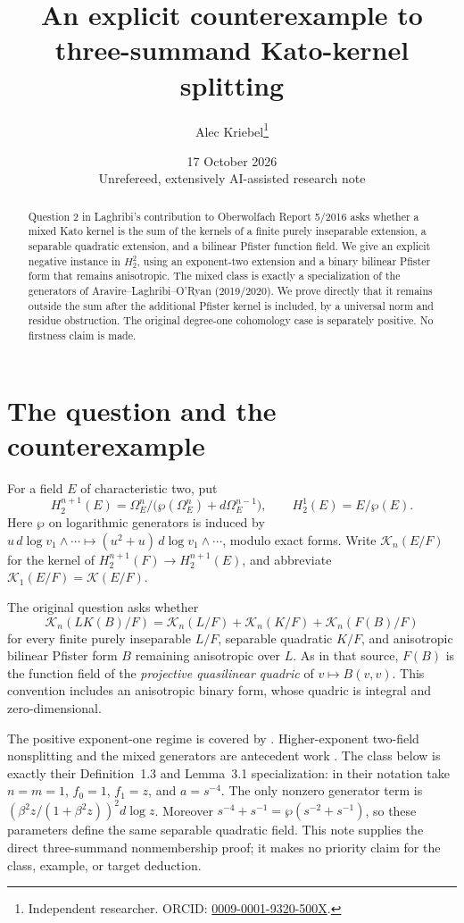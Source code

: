 \documentclass[11pt]{article}
\title{An explicit counterexample to three-summand Kato-kernel splitting}
\author{Alec Kriebel\thanks{Independent researcher. ORCID:
\href{https://orcid.org/0009-0001-9320-500X}{0009-0001-9320-500X}.}}
\date{17 October 2026\\[2pt]\small Unrefereed, extensively AI-assisted research note}
\newcommand{\K}{\mathcal K}
\begin{document}
\maketitle
\begin{abstract}
Question 2 in Laghribi's contribution to Oberwolfach Report 5/2016 asks
whether a mixed Kato kernel is the sum of the kernels of a finite purely
inseparable extension, a separable quadratic extension, and a bilinear
Pfister function field. We give an explicit negative instance in
\(H_2^2\), using an exponent-two extension and a binary bilinear Pfister
form that remains anisotropic. The mixed class is exactly a specialization
of the generators of Aravire--Laghribi--O'Ryan (2019/2020). We prove directly
that it remains outside the sum after the additional Pfister kernel is
included, by a universal norm and residue obstruction. The original
degree-one cohomology case is separately positive. No firstness claim is made.
\end{abstract}

\section{The question and the counterexample}
For a field \(E\) of characteristic two, put
\[
 H_2^{n+1}(E)=
 \Omega_E^n/\bigl(\wp(\Omega_E^n)+d\Omega_E^{n-1}\bigr),\qquad
 H_2^1(E)=E/\wp(E).
\]
Here \(\wp\) on logarithmic generators is induced by
\(u\,d\log v_1\wedge\cdots\mapsto
(u^2+u)\,d\log v_1\wedge\cdots\), modulo exact forms.
Write \(\K_n(E/F)\) for the kernel of
\(H_2^{n+1}(F)\to H_2^{n+1}(E)\), and abbreviate
\(\K_1(E/F)=\K(E/F)\).

The original question \cite[printed p.~251, Question~2]{OWR} asks whether
\begin{equation}\label{question}
 \K_n(LK(B)/F)=\K_n(L/F)+\K_n(K/F)+\K_n(F(B)/F)
\end{equation}
for every finite purely inseparable \(L/F\), separable quadratic \(K/F\),
and anisotropic bilinear Pfister form \(B\) remaining anisotropic over \(L\).
As in that source, \(F(B)\) is the function field of the
\emph{projective quasilinear quadric} of \(v\mapsto B(v,v)\).
This convention includes an anisotropic binary form, whose quadric is
integral and zero-dimensional.

The positive exponent-one regime is covered by \cite{ALO16}.
Higher-exponent two-field nonsplitting and the mixed generators are
antecedent work \cite{ALO20}. The class below is exactly their
Definition~1.3 and Lemma~3.1 specialization: in their notation take
\(n=m=1\), \(f_0=1\), \(f_1=z\), and \(a=s^{-4}\).
The only nonzero generator term is
\((\beta^2z/(1+\beta^2z))^2d\log z\).
Moreover \(s^{-4}+s^{-1}=\wp(s^{-2}+s^{-1})\), so these parameters define
the same separable quadratic field. This note supplies the direct
three-summand nonmembership proof; it makes no priority claim for
the class, example, or target deduction.
\end{document}
